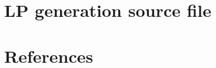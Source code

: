 \documentclass[12pt,twoside]{article}
\begin{document}
\lstset{style=mystyle}

\newpage
\section{LP generation source file}

\newpage


\section{References}\label{Sec: Ref}
\end{document}

